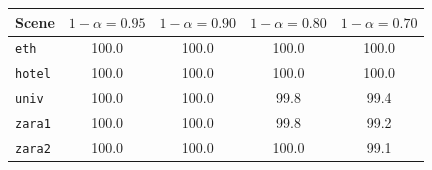 \begin{tabular}{lcccc}
\hline
Scene & $1-\alpha=0.95$ & $1-\alpha=0.90$ & $1-\alpha=0.80$ & $1-\alpha=0.70$ \\
\hline
\texttt{eth} & 100.0 & 100.0 & 100.0 & 100.0 \\
\texttt{hotel} & 100.0 & 100.0 & 100.0 & 100.0 \\
\texttt{univ} & 100.0 & 100.0 & 99.8 & 99.4 \\
\texttt{zara1} & 100.0 & 100.0 & 99.8 & 99.2 \\
\texttt{zara2} & 100.0 & 100.0 & 100.0 & 99.1 \\
\hline
\end{tabular}
